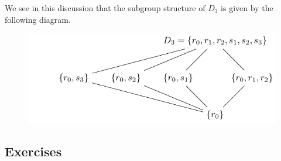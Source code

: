 \documentclass[
]{book}
\theoremstyle{definition}
\theoremstyle{definition}
\theoremstyle{definition}
\theoremstyle{definition}
\theoremstyle{remark}
\begin{document}
We see in this discussion that the subgroup structure of \(D_3\) is given by the following diagram.

\begin{figure}

{\centering \includegraphics[width=0.8\linewidth]{tikz/dihedral_subgroups} 

}

\end{figure}

\hypertarget{exercises-48}{%
\subsection{Exercises}\label{exercises-48}}
\end{document}
